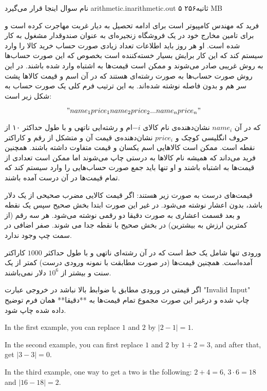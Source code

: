 \gdef\thisproblemauthor{نام صاحب اثر اینجا قرار می‌گیرد}
\gdef\thisproblemdeveloper{نام توسعه‌دهنده اینجا قرار می‌گیرد}
\gdef\thisproblemorigin{\texttt{XXXIII} نام منبع اینجا قرار می‌گیرد}
\begin{problem}{نام سوال اینجا قرار می‌گیرد}
{arithmetic.in}{arithmetic.out}
{۵ ثانیه}{۲۵۶ MB}{}

    فرید که مهندس کامپیوتر است برای ادامه تحصیل به دیار غربت مهاجرت کرده است و برای تامین مخارج خود در یک فروشگاه زنجیره‌ای به عنوان صندوقدار مشغول به کار شده است. او هر روز باید اطلاعات تعداد زیادی صورت حساب‌ خرید کالا را وارد سیستم کند که این کار برایش بسیار خسته‌کننده است بخصوص که این صورت حساب‌ها به روش غریبی صادر می‌شوند و ممکن است قیمت‌ها به اشتباه وارد شده باشند. در این روش صورت‌ حساب‌ها به صورت رشته‌ای هستند که در آن اسم و قیمت کالاها پشت سر هم و بدون فاصله نوشته شده‌‌اند. به این ترتیب فرم کلی یک صورت حساب به شکل زیر است:

    $$"name_1price_1name_2price_2...name_nprice_n"$$

    که در آن $name_i$ نشان‌دهنده‌ی نام کالای ‌$-i$ام و رشته‌ایی ناتهی و با طول حداکثر ۱۰ از حروف انگلیسی کوچک و $price_i$ نشان‌دهنده‌ی قیمت آن و متشکل از رقم و کاراکتر نقطه است.
    ممکن است کالاهایی اسم یکسان و قیمت متفاوت داشته باشند. همچنین فرید می‌داند که همیشه نام کالاها به درستی چاپ می‌شوند اما ممکن است تعدادی از قیمت‌ها به اشتباه باشند و او تنها باید جمع صورت حساب‌هایی را وارد سیستم کند که تمام قیمت‌ها در آن درست آمده باشند.

    قیمت‌های درست به صورت زیر هستند:
    اگر قیمت کالایی مضرب صحیحی از یک دلار باشد، بدون اعشار نوشته می‌شود. در غیر این صورت ابتدا بخش صحیح سپس یک نقطه و بعد قسمت اعشاری به صورت دقیقا دو رقمی نوشته می‌شود.
    هر سه رقم (از کمترین ارزش به بیشترین) در بخش صحیح با نقطه جدا می شوند.
    صفر اضافی در سمت چپ وجود ندارد.
    \InputFile

    ورودی تنها شامل یک خط است که در آن رشته‌ای ناتهی و با طول حداکثر $1000$ کاراکتر آمده‌است. همچنین قیمت‌ها (در صورت مطابقت با نمونه ورودی درست) کمتر از یک سنت و بیشتر از $10^6$ دلار نمی‌باشند.
\OutputFile

    اگر قیمتی در ورودی مطابق با ضوابط بالا نباشد در خروجی عبارت "‌Invalid Input" چاپ شده و درغیر این صورت مجموع تمام قیمت‌ها به **دقیقا** همان فرم توضیح داده ‌شده چاپ شود.


\Examples

\begin{example}
%
%
%
\end{example}

\Explanations

In the first example, you can replace $1$ and $2$ by $|2 - 1| = 1$.

In the second example, you can first replace $1$ and $2$ by $1 + 2 = 3$,
and after that, get $|3 - 3| = 0$.

In the third example, one way to get a two is the following:
$2 + 4 = 6$, $3 \cdot 6 = 18$ and $|16 - 18| = 2$.

\end{problem}
